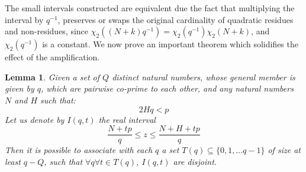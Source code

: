 \documentclass{report}
\newtheorem{lemma}{Lemma}
\begin{document}
The small intervals constructed are equivalent due the fact that multiplying the interval by $q^{-1}$, preserves or swaps the original cardinality of quadratic residues and non-residues, since $\chi_2((N+k)q^{-1})=\chi_2(q^{-1})\chi_2(N+k)$, and $\chi_2(q^{-1})$ is a constant. We now prove an important theorem which solidifies the effect of the amplification.
%
\begin{lemma}
\cite{burgess}Given a set of $Q$ distinct natural numbers, whose general member is given by $q$, which are pairwise co-prime to each other, and any natural numbers $N$ and $H$ such that:
\begin{equation} \label{lemma3cond}
2Hq<p
\end{equation}
Let us denote by $I(q,t)$ the real interval
$$\frac{N+tp}{q} \leq z \leq \frac{N+H+tp}{q}$$
Then it is possible to associate with each $q$ a set $T(q)\subseteq \{0,1,\ldots q-1\}$ of size at least $q-Q$, such that $\forall q \forall t\in T(q)$, $I(q,t)$ are disjoint.
\end{lemma}
\end{document}
